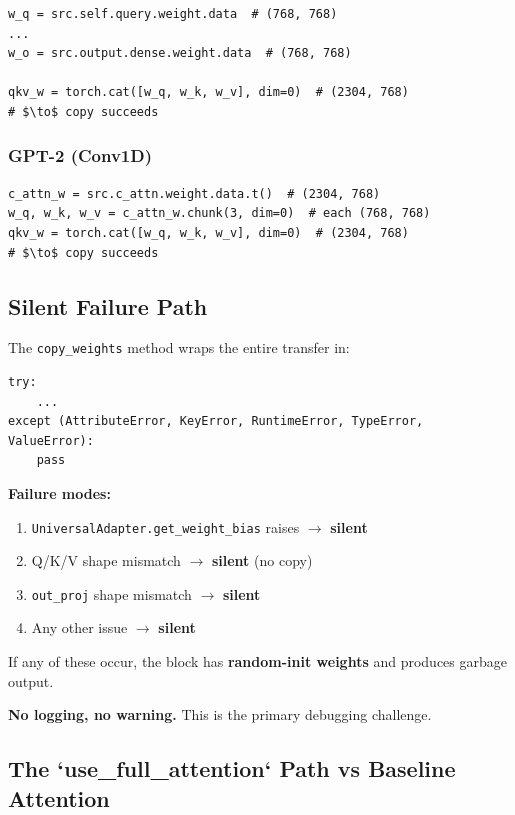 \begin{lstlisting}
w_q = src.self.query.weight.data  # (768, 768)
...
w_o = src.output.dense.weight.data  # (768, 768)

qkv_w = torch.cat([w_q, w_k, w_v], dim=0)  # (2304, 768)
# $\to$ copy succeeds
\end{lstlisting}

\subsubsection{GPT-2 (Conv1D)}

\begin{lstlisting}
c_attn_w = src.c_attn.weight.data.t()  # (2304, 768)
w_q, w_k, w_v = c_attn_w.chunk(3, dim=0)  # each (768, 768)
qkv_w = torch.cat([w_q, w_k, w_v], dim=0)  # (2304, 768)
# $\to$ copy succeeds
\end{lstlisting}

\subsection{Silent Failure Path}

The \texttt{copy\_weights} method wraps the entire transfer in:

\begin{lstlisting}
try:
    ...
except (AttributeError, KeyError, RuntimeError, TypeError, ValueError):
    pass
\end{lstlisting}

\textbf{Failure modes:}
\begin{enumerate}
\item \texttt{UniversalAdapter.get\_weight\_bias} raises $\to$ \textbf{silent}
\item Q/K/V shape mismatch $\to$ \textbf{silent} (no copy)
\item \texttt{out\_proj} shape mismatch $\to$ \textbf{silent}
\item Any other issue $\to$ \textbf{silent}

\end{enumerate}
If any of these occur, the block has \textbf{random-init weights} and produces 
garbage output.

\textbf{No logging, no warning.} This is the primary debugging challenge.

\subsection{The `use\_full\_attention` Path vs Baseline Attention}

